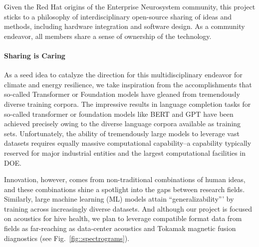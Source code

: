 Given the Red Hat origins of the Enterprise Neurosystem community, this project sticks to a philosophy of interdisciplinary open-source sharing of ideas and methods, including hardware integration and software design. 
As a community endeavor, all members share a sense of ownership of the technology.



\paragraph{Sharing is Caring}
As a seed idea to catalyze the direction for this multidisciplinary endeavor for climate and energy resilience, we take inspiration from the accomplishments that so-called Transformer \cite{Attention2017} or Foundation \cite{StanfordFoundationPaper} models have gleaned from tremendously diverse training corpora.
The impressive results in language completion tasks for so-called transformer or foundation models like BERT \cite{bert} and GPT \cite{GPT2018} have been achieved precisely owing to the diverse language corpora available as training sets. 
Unfortunately, the ability of tremendously large models to leverage vast datasets requires equally massive computational capability--a capability typically reserved for major industrial entities and the largest computational facilities in DOE. 


Innovation, however, comes from non-traditional combinations of human ideas, and these combinations shine a spotlight into the gaps between research fields. 
Similarly, large machine learning (ML) models attain “generalizability”' by training across increasingly diverse datasets. 
And although our project is focused on acoustics for hive health, we plan to leverage compatible format data from fields as far-reaching as data-center acoustics and Tokamak magnetic fusion diagnostics (see Fig.~\ref{fig::spectrograms}).

